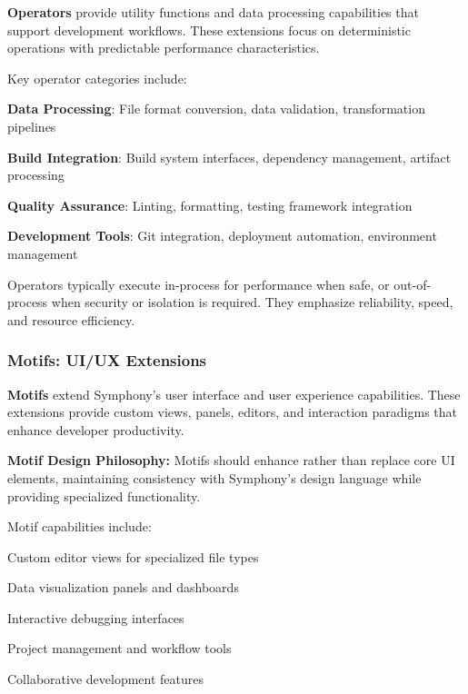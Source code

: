 \textcolor{brandSecondary}{\textbf{Operators}} provide utility functions and data processing capabilities that support development workflows. These extensions focus on deterministic operations with predictable performance characteristics.

Key operator categories include:

\begin{expandedlist}
\item \textbf{Data Processing}: File format conversion, data validation, transformation pipelines
\item \textbf{Build Integration}: Build system interfaces, dependency management, artifact processing
\item \textbf{Quality Assurance}: Linting, formatting, testing framework integration
\item \textbf{Development Tools}: Git integration, deployment automation, environment management
\end{expandedlist}

Operators typically execute in-process for performance when safe, or out-of-process when security or isolation is required. They emphasize reliability, speed, and resource efficiency.

\subsubsection{Motifs: UI/UX Extensions}
\label{subsubsec:motifs}

\textcolor{brandAccent}{\textbf{Motifs}} extend Symphony's user interface and user experience capabilities. These extensions provide custom views, panels, editors, and interaction paradigms that enhance developer productivity.

\begin{successbox}
\textbf{Motif Design Philosophy:} Motifs should enhance rather than replace core UI elements, maintaining consistency with Symphony's design language while providing specialized functionality.
\end{successbox}

Motif capabilities include:

\begin{compactlist}
\item Custom editor views for specialized file types
\item Data visualization panels and dashboards  
\item Interactive debugging interfaces
\item Project management and workflow tools
\item Collaborative development features
\end{compactlist}

